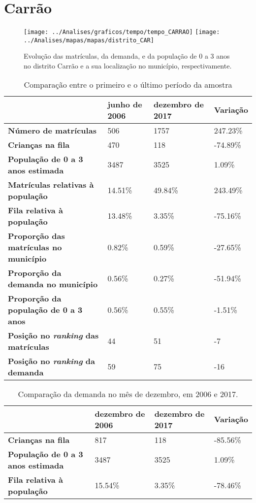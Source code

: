 \section{Carrão}
\begin{figure}[H]
\centering
\texttt{[image: ../Analises/graficos/tempo/tempo\_CARRAO]}
\texttt{[image: ../Analises/mapas/mapas/distrito\_CAR]}
\caption{Evolução das matrículas, da demanda, e da população de 0 a 3 anos no distrito Carrão e a sua localização no município, respectivamente.}
\end{figure}
\begin{table}[H]
\begin{tabular}{l|l|l|l}
\textbf{}                                      & \textbf{junho de 2006}       & \textbf{dezembro de 2017}    & \textbf{Variação} \\ \hline
\textbf{Número de matrículas}                  & 506 & 1757 & 247.23\% \\ \hline
\textbf{Crianças na fila}                      & 470 & 118 & -74.89\% \\ \hline
\textbf{População de 0 a 3 anos estimada}      & 3487 & 3525 & 1.09\% \\ \hline
\textbf{Matrículas relativas à população}      & 14.51\% & 49.84\% & 243.49\% \\ \hline
\textbf{Fila relativa à população}             & 13.48\% & 3.35\% & -75.16\% \\ \hline
\textbf{Proporção das matrículas no município} & 0.82\% & 0.59\% & -27.65\% \\ \hline
\textbf{Proporção da demanda no município}     & 0.56\% & 0.27\% & -51.94\% \\ \hline
\textbf{Proporção da população de 0 a 3 anos}  & 0.56\% & 0.55\% & -1.51\% \\ \hline
\textbf{Posição no \textit{ranking} das matrículas}     & 44 & 51 & -7 \\ \hline
\textbf{Posição no \textit{ranking} da demanda}         & 59 & 75 & -16 \\ 
\end{tabular}
\caption{Comparação entre o primeiro e o último período da amostra}
\end{table}
\begin{table}[H]
\begin{tabular}{l|l|l|l}
\textbf{}                                 & \textbf{dezembro de 2006} & \textbf{dezembro de 2017} & \textbf{Variação} \\ \hline
\textbf{Crianças na fila}                      & 817 & 118 & -85.56\% \\ \hline
\textbf{População de 0 a 3 anos estimada}      & 3487 & 3525 & 1.09\% \\ \hline
\textbf{Fila relativa à população}             & 15.54\% & 3.35\% & -78.46\% \\
\end{tabular}
\caption{Comparação da demanda no mês de dezembro, em 2006 e 2017.}
\end{table}
